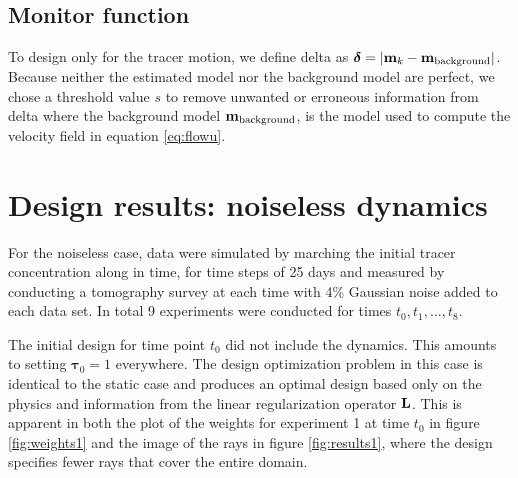 \documentclass[leqno,onefignum,onetabnum]{siamltexmm}
\newcommand{\bfL}	{{\bf{L}}}
\newcommand{\bfm}	{{\bf{m}}}
\newcommand{\bftau}      {{\boldsymbol \tau}}
\newcommand{\bfdelta}	 { { \boldsymbol \delta} }
\begin{document}
\subsection{Monitor function}

To design only for the tracer motion, we define delta as $\bfdelta = |\bfm_{k} -\bfm_{\text{background}}|$. Because  neither the estimated model nor the background model are perfect, we  chose a threshold value $s$ to remove unwanted or erroneous information from delta 
where the background model $\bfm_{\text{background}} $, is the model used to compute the velocity field in equation \eqref{eq:flowu}.

\section{Design results: noiseless dynamics}
\label{sec:Results}
For the noiseless case, data were simulated by marching  the initial tracer concentration along in time, for time steps of 25 days and measured by conducting a tomography survey at each time with 4\% Gaussian noise added to each data set. In total 9 experiments were conducted for times $t_0,t_1,...,t_8$. 


The initial design for time point $t_0$ did not include the dynamics. This amounts to  setting $\bftau_0 = 1$ everywhere. The design optimization problem in this case is  identical to the static case and produces an optimal design based only on the physics and information from the linear regularization operator $\bfL$. This is apparent in both the plot of the weights for experiment 1 at time  $t_0$ in figure \ref{fig:weights1} and the image of the rays in figure \ref{fig:results1}, where the design specifies fewer rays that cover the entire domain. 
\end{document}
